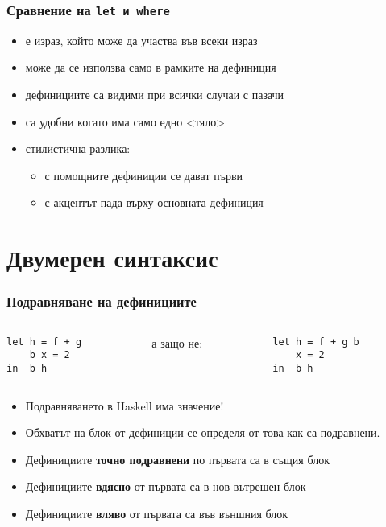 \documentclass[alsotrans]{beamerswitch}
\begin{document}
\begin{frame}
  \frametitle{Сравнение на \tt{let} и \tt{where}}

  \begin{itemize}[<+->]
  \item {} е израз, който може да участва във всеки израз
  \item {} може да се използва само в рамките на дефиниция
  \item {} дефинициите са видими при всички случаи с пазачи
  \item {} са удобни когато има само едно <тяло>
  \item стилистична разлика:
    \begin{itemize}
    \item с  помощните дефиниции се дават първи
    \item с  акцентът пада върху основната дефиниция
    \end{itemize}
  \end{itemize}
\end{frame}

\section{Двумерен синтаксис}

\begin{frame}[fragile]
  \frametitle{Подравняване на дефинициите}

  \begin{columns}[onlytextwidth]
    \begin{column}{0.35\textwidth}
\begin{lstlisting}
let h = f + g
    b x = 2
in  b h
\end{lstlisting}
    \end{column}
    \pause
    \begin{column}{0.3\textwidth}
      а защо не:
    \end{column}
    \begin{column}{0.35\textwidth}
\begin{lstlisting}
let h = f + g b
    x = 2
in  b h
\end{lstlisting}
    \end{column}
  \end{columns}
  \vspace{1em}
\onslide<+->
\begin{itemize}[<+->]
\item \alert{Подравняването в Haskell има значение!}
\item Обхватът на блок от дефиниции се определя от това как са подравнени.
\item Дефинициите \textbf{точно подравнени} по първата са в същия блок
\item Дефинициите \textbf{вдясно} от първата са в нов вътрешен блок
\item Дефинициите \textbf{вляво} от първата са във външния блок
\end{itemize}
\end{frame}
\end{document}

